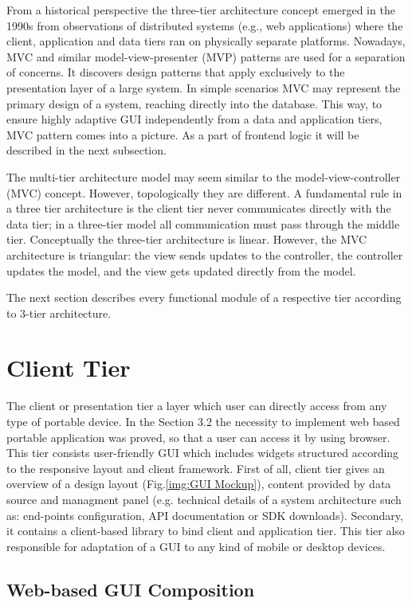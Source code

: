   From a historical perspective the three-tier architecture concept emerged in the 1990s from observations of distributed systems\cite{wiki:3tier} (e.g., web applications) where the client, application and data tiers ran on physically separate platforms. Nowadays, MVC and similar model-view-presenter (MVP) patterns are used for a separation of concerns. It discovers design patterns that apply exclusively to the presentation layer of a large system. In simple scenarios MVC may represent the primary design of a system, reaching directly into the database. This way, to ensure highly adaptive GUI independently from a data and application tiers, MVC pattern comes into a picture. As a part of frontend logic it will be described in the next subsection.
  
  The multi-tier architecture model may seem similar to the model-view-controller (MVC) concept. However, topologically they are different. A fundamental rule in a three tier architecture is the client tier never communicates directly with the data tier; in a three-tier model all communication must pass through the middle tier. Conceptually the three-tier architecture is linear. However, the MVC architecture is triangular: the view sends updates to the controller, the controller updates the model, and the view gets updated directly from the model.

  The next section describes every functional module of a respective tier according to 3-tier architecture.

\section{Client Tier}
  The client or presentation tier a layer which user can directly access from any type of portable device. In the Section 3.2 the necessity to implement web based portable application was proved, so that a user can access it by using browser. This tier consists user-friendly GUI which includes widgets structured according to the responsive layout and client framework. First of all, client tier gives an overview of a design layout (Fig.\ref{img:GUI Mockup}), content provided by data source and managment panel (e.g. technical details of a system architecture such as: end-points configuration, API documentation or SDK downloads). Secondary, it contains a client-based library to bind client and application tier. This tier also responsible for adaptation of a GUI to any kind of mobile or desktop devices. 
  \subsection{Web-based GUI Composition}


